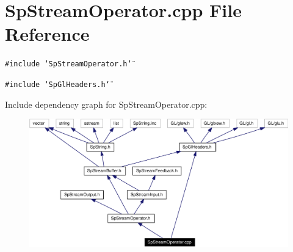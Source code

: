 \section{Sp\-Stream\-Operator.cpp File Reference}
\label{SpStreamOperator_8cpp}
{\tt \#include \char`\"{}Sp\-Stream\-Operator.h\char`\"{}}\par
{\tt \#include \char`\"{}Sp\-Gl\-Headers.h\char`\"{}}\par


Include dependency graph for Sp\-Stream\-Operator.cpp:\begin{figure}[H]
\begin{center}
\leavevmode
\includegraphics[width=321pt]{SpStreamOperator_8cpp__incl}
\end{center}
\end{figure}
